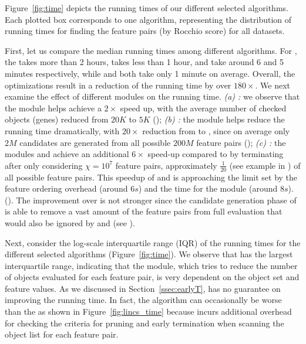  Figure~\ref{fig:time} depicts the running times of our different selected algorithms. Each plotted box corresponds to one algorithm, representing the distribution of running times for finding the \topk feature pairs (by Rocchio score) for all datasets.

First, let us compare the median running times among different algorithms. For \msig, the \baseline takes more than 2 hours, \earlyOrder takes less than 1 hour, \samp and \sampOpt take around 6 and 5 minutes respectively, while \horiz and \vertic both take only 1 minute on average. Overall, the optimizations result in a reduction of the running time by over {\bf $180\times$}. We next examine the effect of different modules on the running time. {\em (a) \earlyT:} we observe that the \earlyT module helps achieve a $2\times$ speed up, with the average number of checked objects (genes) reduced from $20K$ to $5K$ (\timetbl); {\em (b) \sampling:} the \sampling module helps reduce the running time dramatically, with $20\times$ reduction from \baseline to \sampOpt, since on average only $2M$ candidates are generated from all possible $200M$ feature pairs (\timetbl);
{\em (c) \traversal:} the modules \horiz and \vertic achieve an additional $6\times$ speed-up compared to \sampOpt by terminating after only considering $\chi=10^7$ feature pairs, approximately $\frac{1}{20}$ (see example in \travnote) of all possible feature pairs. This speedup of \horiz and \vertic is approaching the limit set by the feature ordering overhead (around $6s$) and the time for the \trans module (around $8s$). (\timetbl). The improvement over \sampOpt is not stronger since the candidate generation phase of \sampOpt is able to remove a vast amount of the feature pairs from full evaluation that would also be ignored by \horiz and \vertic (see \timetbl).

Next, consider the log-scale interquartile range (IQR) of the running times for the different selected algorithms (Figure~\ref{fig:time}). We observe that \earlyOrder has the largest interquartile range, indicating that the \earlyT module, which tries to reduce the number of objects evaluated for each feature pair, is very dependent on the object set and feature values. As we discussed in Section~\ref{ssec:earlyT}, \earlyT has no guarantee on improving the running time. In fact, the algorithm can occasionally be worse than the \baseline as shown in Figure~\ref{fig:lincs_time} because \earlyT incurs additional overhead for checking the criteria for pruning and early termination when scanning the object list for each feature pair.

